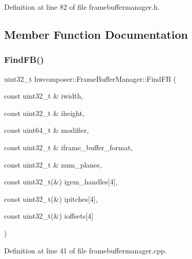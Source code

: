 Definition at line 82 of file framebuffermanager.\+h.


\begin{DoxyCode}{0}
\end{DoxyCode}


\subsection{Member Function Documentation}
\mbox{\label{classhwcomposer_1_1FrameBufferManager_a05c6f8e84120746c4aa6fede497142e0}} 
\subsubsection{\texorpdfstring{Find\+F\+B()}{FindFB()}}
{\footnotesize\ttfamily uint32\+\_\+t hwcomposer\+::\+Frame\+Buffer\+Manager\+::\+Find\+FB (\begin{DoxyParamCaption}\item[{const uint32\+\_\+t \&}]{iwidth,  }\item[{const uint32\+\_\+t \&}]{iheight,  }\item[{const uint64\+\_\+t \&}]{modifier,  }\item[{const uint32\+\_\+t \&}]{iframe\+\_\+buffer\+\_\+format,  }\item[{const uint32\+\_\+t \&}]{num\+\_\+planes,  }\item[{const uint32\+\_\+t(\&)}]{igem\+\_\+handles\mbox{[}4\mbox{]},  }\item[{const uint32\+\_\+t(\&)}]{ipitches\mbox{[}4\mbox{]},  }\item[{const uint32\+\_\+t(\&)}]{ioffsets\mbox{[}4\mbox{]} }\end{DoxyParamCaption})}



Definition at line 41 of file framebuffermanager.\+cpp.


